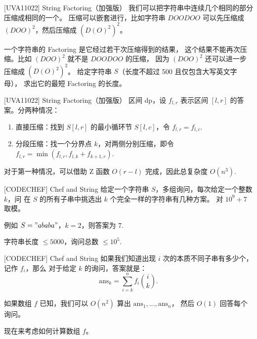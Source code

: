 \documentclass{beamer}
\begin{document}
\begin{frame}[fragile]{[UVA11022] String Factoring（加强版）}
    \small
    我们可以把字符串中连续几个相同的部分压缩成相同的一个。
    压缩可以嵌套进行，比如字符串 $DOODOO$ 可以先压缩成 $(DOO)^2$，然后压缩成 $(D(O)^2)^2$。

    \vspace{1em}
    一个字符串的 Factoring 是它经过若干次压缩得到的结果，
    这个结果不能再次压缩。比如 $(DOO)^2$ 就不是 $DOODOO$ 的压缩，
    因为 $(DOO)^2$ 还可以进一步压缩成 $(D(O)^2)^2$。
    给定字符串 $S$（长度不超过 500 且仅包含大写英文字母），
    求出它的最短 Factoring 的长度。
\end{frame}

\begin{frame}[fragile]{[UVA11022] String Factoring（加强版）}
    \small
    区间 dp，设 $f_{l,r}$ 表示区间 $[l,r]$ 的答案。分两种情况：

    \begin{enumerate}
        \pause \item 直接压缩：找到 $S[l,r]$ 的最小循环节 $S[l,c]$，令 $f_{l,r}=f_{l,c}$.
        \pause \item 分段压缩：找一个分界点 $k$，对两侧分别压缩，即令 $f_{l,r}=\min(f_{l,r},f_{l,k}+f_{k+1,r})$.
    \end{enumerate}

    \pause 对于第一种情况，可以借助 Z 函数 $O(r-l)$ 完成，因此总复杂度 $O(n^3)$.
\end{frame}

\begin{frame}[fragile]{[CODECHEF] Chef and String}
    \small
    给定一个字符串 $S$，多组询问，每次给定一个整数 $k$，问
    在 $S$ 的所有子串中挑选出 $k$ 个完全一样的字符串有几种方案。
    对 $10^9+7$ 取模。

    \vspace{1em}
    例如 $S="ababa"$，$k=2$，则答案为 $7$.

    \vspace{1em}
    字符串长度 $\leq 5000$，询问总数 $\leq 10^5$.
\end{frame}

\begin{frame}[fragile]{[CODECHEF] Chef and String}
    \small
    如果我们知道出现 $i$ 次的本质不同子串有多少个，记作 $f_i$，那么
    对于给定 $k$ 的询问，答案就是：
    \begin{equation*}
        \text{ans}_k=\sum_{i=k}^n f_i \binom{i}{k}.
    \end{equation*}

    如果数组 $f$ 已知，我们可以 $O(n^2)$ 算出 $\text{ans}_1,...,\text{ans}_n$，
    然后 $O(1)$ 回答每个询问。

    \vspace{1em}\pause
    现在来考虑如何计算数组 $f$。
\end{frame}
\end{document}
